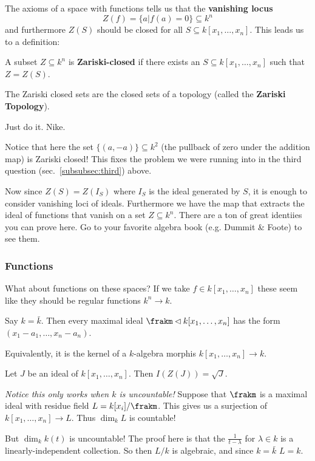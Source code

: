 \documentclass[12pt]{article}
\begin{document}
The axioms of a space with functions tells us that the \textbf{vanishing locus}
\[Z(f)=\{a|f(a)=0\}\subseteq k^n\]
and furthermore $Z(S)$ should be closed for all $S\subseteq k[x_1,\dots,x_n]$. This leads us to a definition:
\begin{defn}
	A subset $Z\subseteq k^n$ is \textbf{Zariski-closed} if there exists an $S\subseteq k[x_1,\dots,x_n]$
	such that $Z=Z(S)$.
\end{defn}
\begin{lem}
	The Zariski closed sets are the closed sets of a topology (called the \textbf{Zariski Topology}).
\end{lem}
\begin{prf}
	Just do it. Nike. \checked
\end{prf}
\begin{rmk}
	Notice that here the set $\{(a,-a)\}\subseteq k^2$ (the pullback of zero under the addition map) is Zariski closed!
	This fixes the problem we were running into in the third question (sec.~\ref{subsubsec:third}) above.
\end{rmk}
Now since $Z(S)=Z(I_S)$ where $I_S$ is the ideal generated by $S$, it is enough to consider vanishing loci of ideals. Furthermore we have the 
map that extracts the ideal of functions that vanish on a set $Z\subseteq k^n$. There are a ton of great identiies you can prove here. Go to your 
favorite algebra book (e.g. Dummit \& Foote) to see them.

\subsubsection{Functions}
What about functions on these spaces? If we take $f\in k[x_1,\dots,x_n]$ these seem like they should be regular functions $k^n\to k$.
\begin{thm}
	Say $k=\bar k$. Then every maximal ideal $\frakm\lhd k[x_1,\dots,x_n]$ has the form $(x_1-a_1,\dots,x_n-a_n)$.
\end{thm}
\begin{rmk}
	Equivalently, it is the kernel of a $k$-algebra morphis $k[x_1,\dots,x_n]\to k$.
\end{rmk}
\begin{cor}[Nullstellensatz]\label{nullstellensatz}
	Let $J$ be an ideal of $k[x_1,\dots,x_n]$. Then $I(Z(J))=\sqrt{J}$.
\end{cor}
\begin{prf}
	\textit{Notice this only works when $k$ is uncountable!} Suppose that $\frakm$ is a maximal ideal with residue field 
	$L=k[x_i]/\frakm$. This gives us a surjection of $k[x_1,\dots,x_n]\to L$. Thus $\dim_k L$ is countable!

	But $\dim_k k(t)$ is uncountable! The proof here is that the $\frac{1}{t-\lambda}$ for $\lambda\in k$ is a linearly-independent collection.
	So then $L/k$ is algebraic, and since $k=\bar k$ $L=k$.
\end{prf}
\end{document}
